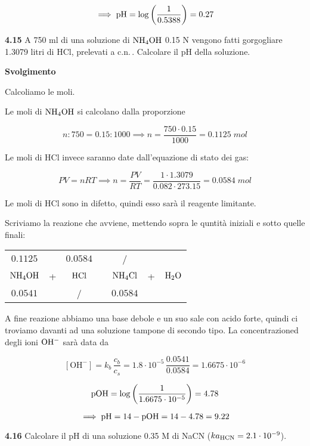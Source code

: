 $$\implies \rm pH=\log{\left(\frac{1}{0.5388}\right)}=0.27$$

\vspace{0.2cm}\textbf{4.15} A 750 ml di una soluzione di $\rm NH_4OH$ 0.15 N vengono fatti gorgogliare 1.3079 litri di HCl, prelevati a c.n.\,. Calcolare il pH della soluzione.

\vspace{0.2cm}\large\textbf{Svolgimento}\normalsize

\vspace{0.2cm}Calcoliamo le moli.

Le moli di $\rm NH_4OH$ si calcolano dalla proporzione

$$n:750=0.15:1000
\implies
n=\frac{750 \cdot 0.15}{1000}=0.1125\;mol$$

Le moli di HCl invece saranno date dall'equazione di stato dei gas:

$$PV=nRT \implies n=\frac{PV}{RT}
=\frac{1 \cdot 1.3079}{0.082 \cdot 273.15}=0.0584\;mol$$

Le moli di HCl sono in difetto, quindi esso sarà il reagente limitante.

Scriviamo la reazione che avviene, mettendo sopra le quntità iniziali e sotto quelle finali:

\begin{center}
    \begin{tabular}{ccccccc}
        $0.1125$ &  & $0.0584$ & & / &&\\
        $\rm NH_4OH$ & + & $\rm HCl$ & \ce{->} & $\rm NH_4Cl$ & + & $\rm H_2O$\\
        $0.0541$ &  & / & & $0.0584$ &&\\
    \end{tabular}
\end{center}

A fine reazione abbiamo una base debole e un suo sale con acido forte, quindi ci troviamo davanti ad una soluzione tampone di secondo tipo. La concentrazioned degli ioni $\rm OH^-$ sarà data da

$$[\text{OH}^-]=k_b\,\frac{c_b}{c_s}
=1.8 \cdot 10^{-5}\,\frac{0.0541}{0.0584}
=1.6675 \cdot 10^{-6}$$

$$\rm pOH=\log \left( \frac{1}{1.6675 \cdot 10^{-5}} \right)=4.78$$

$$\implies \rm pH=14-pOH=14-4.78=9.22$$

\vspace{0.2cm}\textbf{4.16} Calcolare il pH di una soluzione 0.35 M di NaCN ($k{a_{\rm HCN}} = 2.1 \cdot 10^{-9}$).

